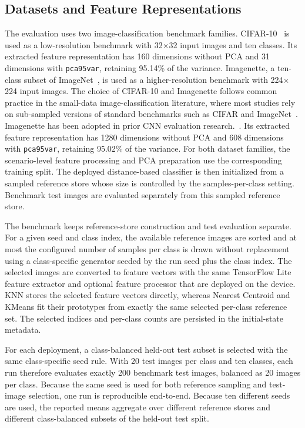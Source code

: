 \documentclass[sigconf,review,nonacm]{acmart}
\begin{document}
\subsection{Datasets and Feature Representations}
The evaluation uses two image-classification benchmark families.
CIFAR-10~\cite{krizhevsky2009cifar} is used as a low-resolution benchmark with 32$\times$32 input images and ten classes.
Its extracted feature representation has 160 dimensions without PCA and 31 dimensions with \texttt{pca95var}, retaining 95.14\% of the variance.
Imagenette, a ten-class subset of ImageNet~\cite{deng2009imagenet,howard2019imagenette}, is used as a higher-resolution benchmark with 224$\times$224 input images.
The choice of CIFAR-10 and Imagenette follows common practice in the small-data image-classification literature, where most studies rely on sub-sampled versions of standard benchmarks such as CIFAR and ImageNet~\cite{brigato2022small}. Imagenette has been adopted in prior CNN evaluation research.~\cite{saberifard2025xtorch}.
Its extracted feature representation has 1280 dimensions without PCA and 608 dimensions with \texttt{pca95var}, retaining 95.02\% of the variance.
For both dataset families, the scenario-level feature processing and PCA preparation use the corresponding training split.
The deployed distance-based classifier is then initialized from a sampled reference store whose size is controlled by the samples-per-class setting. Benchmark test images are evaluated separately from this sampled reference store.

The benchmark keeps reference-store construction and test evaluation separate.
For a given seed and class index, the available reference images are sorted and at most the configured number of samples per class is drawn without replacement using a class-specific generator seeded by the run seed plus the class index.
The selected images are converted to feature vectors with the same TensorFlow Lite feature extractor and optional feature processor that are deployed on the device.
KNN stores the selected feature vectors directly, whereas Nearest Centroid and KMeans fit their prototypes from exactly the same selected per-class reference set. The selected indices and per-class counts are persisted in the initial-state metadata.

For each deployment, a class-balanced held-out test subset is selected with the same class-specific seed rule.
With 20 test images per class and ten classes, each run therefore evaluates exactly 200 benchmark test images, balanced as 20 images per class.
Because the same seed is used for both reference sampling and test-image selection, one run is reproducible end-to-end. Because ten different seeds are used, the reported means aggregate over different reference stores and different class-balanced subsets of the held-out test split.
\end{document}
